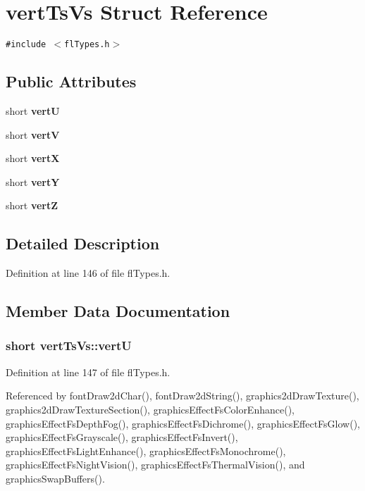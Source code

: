 \section{vert\-Ts\-Vs Struct Reference}
\label{structvertTsVs}
{\tt \#include $<$fl\-Types.h$>$}

\subsection*{Public Attributes}
\begin{CompactItemize}
\item 
short {\bf vert\-U}
\item 
short {\bf vert\-V}
\item 
short {\bf vert\-X}
\item 
short {\bf vert\-Y}
\item 
short {\bf vert\-Z}
\end{CompactItemize}


\subsection{Detailed Description}




Definition at line 146 of file fl\-Types.h.

\subsection{Member Data Documentation}
\subsubsection{\setlength{\rightskip}{0pt plus 5cm}short {\bf vert\-Ts\-Vs::vert\-U}}\label{structvertTsVs_d936343eefb14453c2ce7dbe1c974998}




Definition at line 147 of file fl\-Types.h.

Referenced by font\-Draw2d\-Char(), font\-Draw2d\-String(), graphics2d\-Draw\-Texture(), graphics2d\-Draw\-Texture\-Section(), graphics\-Effect\-Fs\-Color\-Enhance(), graphics\-Effect\-Fs\-Depth\-Fog(), graphics\-Effect\-Fs\-Dichrome(), graphics\-Effect\-Fs\-Glow(), graphics\-Effect\-Fs\-Grayscale(), graphics\-Effect\-Fs\-Invert(), graphics\-Effect\-Fs\-Light\-Enhance(), graphics\-Effect\-Fs\-Monochrome(), graphics\-Effect\-Fs\-Night\-Vision(), graphics\-Effect\-Fs\-Thermal\-Vision(), and graphics\-Swap\-Buffers().

